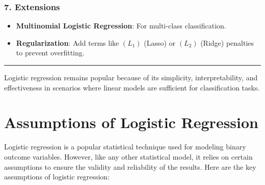\documentclass[12pt]{book}
\providecommand{\tightlist}{%
  \setlength{\itemsep}{0pt}\setlength{\parskip}{0pt}}
\begin{document}
\subsubsection{\texorpdfstring{7.
\textbf{Extensions}}{7. Extensions}}\label{extensions}

\begin{itemize}
\tightlist
\item
  \textbf{Multinomial Logistic Regression}: For multi-class
  classification.
\item
  \textbf{Regularization}: Add terms like \(( L_1 )\) (Lasso) or
  \(( L_2 )\) (Ridge) penalties to prevent overfitting.
\end{itemize}

\begin{center}\rule{0.5\linewidth}{0.5pt}\end{center}

Logistic regression remains popular because of its simplicity,
interpretability, and effectiveness in scenarios where linear models are
sufficient for classification tasks.

\section{\texorpdfstring{\textbf{Assumptions of Logistic
Regression}}{Assumptions of Logistic Regression}}\label{assumptions-of-logistic-regression}

Logistic regression is a popular statistical technique used for modeling
binary outcome variables. However, like any other statistical model, it
relies on certain assumptions to ensure the validity and reliability of
the results. Here are the key assumptions of logistic regression:
\end{document}
